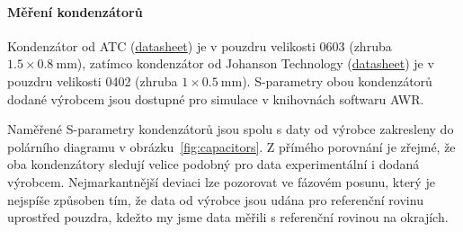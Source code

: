 \documentclass[11pt,a4paper]{article}
\begin{document}
\paragraph*{Měření kondenzátorů} Kondenzátor od ATC (\href{https://rfs.kyocera-avx.com/millimeter-wave-surface-mount-capacitors}{datasheet}) je v pouzdru velikosti 0603 (zhruba $1.5 \times 0.8\ \mathrm{mm}$), zatímco kondenzátor od Johanson Technology (\href{https://www.johansontechnology.com/r07s}{datasheet}) je v pouzdru velikosti 0402 (zhruba $1 \times 0.5\ \mathrm{mm}$). S-parametry obou kondenzátorů dodané výrobcem jsou dostupné pro simulace v knihovnách softwaru AWR.

Naměřené S-parametry kondenzátorů jsou spolu s daty od výrobce zakresleny do polárního diagramu v obrázku~\ref{fig:capacitors}. Z přímého porovnání je zřejmé, že oba kondenzátory sledují velice podobný pro data experimentální i dodaná výrobcem. Nejmarkantnější deviaci lze pozorovat ve fázovém posunu, který je nejspíše způsoben tím, že data od výrobce jsou udána pro referenční rovinu uprostřed pouzdra, kdežto my jsme data měřili s referenční rovinou na okrajích.
\end{document}
